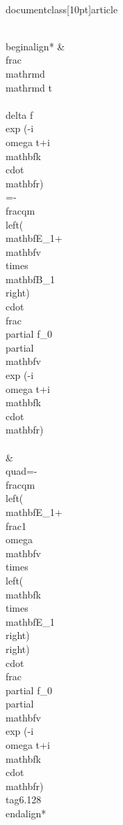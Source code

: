 \\documentclass[10pt]{article}
\begin{document}
{{{{\\begin{align*}
& \\frac{\\mathrm{d}}{\\mathrm{d} t}\\{\\delta f \\exp (-i \\omega t+i \\mathbf{k} \\cdot \\mathbf{r})\\}=-\\frac{q}{m}\\left(\\mathbf{E}_{1}+\\mathbf{v} \\times \\mathbf{B}_{1}\\right) \\cdot \\frac{\\partial f_{0}}{\\partial \\mathbf{v}} \\exp (-i \\omega t+i \\mathbf{k} \\cdot \\mathbf{r}) \\\\
& \\quad=-\\frac{q}{m}\\left(\\mathbf{E}_{1}+\\frac{1}{\\omega} \\mathbf{v} \\times\\left(\\mathbf{k} \\times \\mathbf{E}_{1}\\right)\\right) \\cdot \\frac{\\partial f_{0}}{\\partial \\mathbf{v}} \\exp (-i \\omega t+i \\mathbf{k} \\cdot \\mathbf{r}) \\tag{6.128}
\\end{align*}


}}}}
\end{document}

